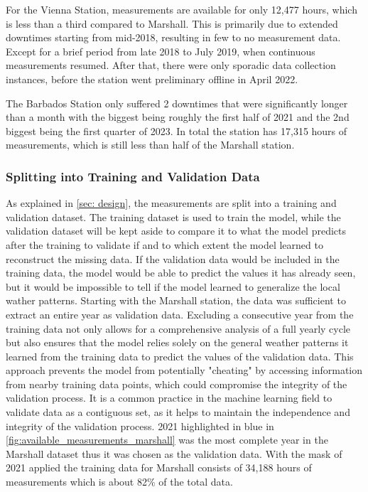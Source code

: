 For the Vienna Station, measurements are available for only 12,477 hours, which is less than a third compared to Marshall. This is primarily due to extended downtimes starting from mid-2018, resulting in few to no measurement data. Except for a brief period from late 2018 to July 2019, when continuous measurements resumed. After that, there were only sporadic data collection instances, before the station went preliminary offline in April 2022.

The Barbados Station only suffered 2 downtimes that were significantly longer than a month with the biggest being roughly the first half of 2021 and the 2nd biggest being the first quarter of 2023. In total the station has 17,315 hours of measurements, which is still less than half of the Marshall station. 

\subsubsection*{Splitting into Training and Validation Data}

As explained in \autoref{sec: design}, the measurements are split into a training and validation dataset. The training dataset is used to train the model, while the validation dataset will be kept aside to compare it to what the model predicts after the training to validate if and to which extent the model learned to reconstruct the missing data. If the validation data would be included in the training data, the model would be able to predict the values it has already seen, but it would be impossible to tell if the model learned to generalize the local wather patterns.
Starting with the Marshall station, the data was sufficient to extract an entire year as validation data. Excluding a consecutive year from the training data not only allows for a comprehensive analysis of a full yearly cycle but also ensures that the model relies solely on the general weather patterns it learned from the training data to predict the values of the validation data. This approach prevents the model from potentially "cheating" by accessing information from nearby training data points, which could compromise the integrity of the validation process. It is a common practice in the machine learning field to validate data as a contiguous set, as it helps to maintain the independence and integrity of the validation process. 2021 highlighted in blue in \ref{fig:available_measurements_marshall} was the most complete year in the Marshall dataset thus it was chosen as the validation data. With the mask of 2021 applied the training data for Marshall consists of 34,188 hours of measurements which is about 82\% of the total data.

